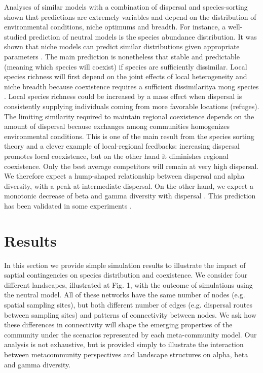 \documentclass[12pt]{article}
\begin{document}
Analyses of similar models with a combination of dispersal and species-sorting
shown that predictions are extremely variables and depend on the distribution of
environmental conditions, niche optimums and breadth. For instance, a
well-studied prediction of neutral models is the species abundance distribution.
It was shown that niche models can predict similar distributions given appropriate parameters
\parencite{Tilman2004,Gravel2006}. The main prediction is nonetheless that
stable and predictable (meaning which species will coexist) if species are
sufficiently dissimilar. Local species richness will first depend on the joint
effects of local heterogeneity and niche breadth because coexistence requires a
sufficient dissimilaritya mong species \parencite{Schwilk2005}. Local species richness could be
increased by a mass effect when dispersal is consistently supplying individuals
coming from more favorable locations (refuges). The limiting similarity required
to maintain regional coexistence depends on the amount of dispersal because
exchanges among communities homogenizes environmental conditions. This is one of
the main result from the species sorting theory and a clever example of
local-regional feedbacks: increasing dispersal promotes local coexistence, but
on the other hand it diminishes regional coexistence. Only the best average
competitors will remain at very high dispersal.  We therefore expect a
hump-shaped relationship between dispersal and alpha diversity, with a peak at
intermediate dispersal. On the other hand, we expect a monotonic decrease of
beta and gamma diversity with dispersal \parencite{Mouquet2003}. This prediction
has been validated in some experiments \parencite{Venail2008, Logue2011}.

\section{Results}

In this section we provide simple simulation results to illustrate the impact of
saptial contingencies on species distribution and coexistence. We consider four
different landscapes, illustrated at Fig. 1,  with the outcome of simulations
using the neutral model. All of these networks have the same number of nodes
(e.g. spatial sampling sites), but both different number of edges (e.g.
dispersal routes between sampling sites) and patterns of connectivity between
nodes. We ask how these differences in connectivity will shape the emerging
properties of the community under the scenarios represented by each
meta-community model. Our analysis is not exhaustive, but is provided simply to
illustrate the interaction between metacommunity perspectives and landscape
structures on alpha, beta and gamma diversity. 
\end{document}

